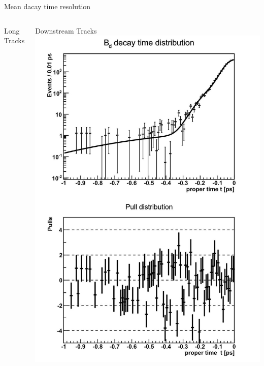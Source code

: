 \documentclass{beamer}
\begin{document}
	
	\begin{frame}{Mean dacay time resolution}
		\begin{columns}
	\begin{block}{Long Tracks}
	\end{block}
	\begin{block}{Downstream Tracks}
	\includegraphics[width=\textwidth]{resolution_ds}
	\end{block}
	\end{columns}
	\end{frame}
\end{document}
